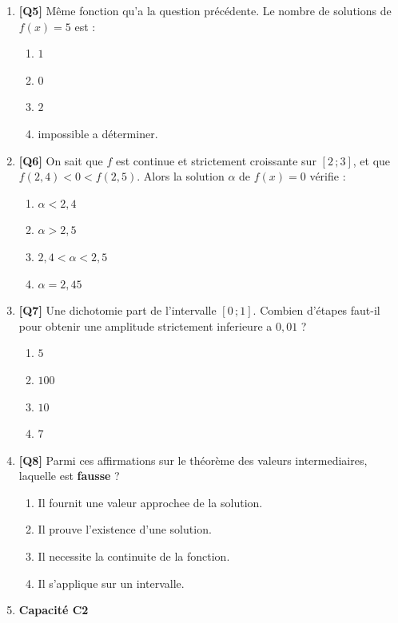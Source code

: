 \begin{enumerate}
\item \textbf{[Q5]} Même fonction qu'a la question précédente. Le nombre de solutions de $f(x) = 5$ est :
  \begin{enumerate}[label=\Alph*.]
    \item $1$
    \item $0$
    \item $2$
    \item impossible a déterminer.
  \end{enumerate}

\item \textbf{[Q6]} On sait que $f$ est continue et strictement croissante sur $[2\,;3]$, et que $f(2{,}4) < 0 < f(2{,}5)$. Alors la solution $\alpha$ de $f(x) = 0$ vérifie :
  \begin{enumerate}[label=\Alph*.]
    \item $\alpha < 2{,}4$
    \item $\alpha > 2{,}5$
    \item $2{,}4 < \alpha < 2{,}5$
    \item $\alpha = 2{,}45$
  \end{enumerate}

\item \textbf{[Q7]} Une dichotomie part de l'intervalle $[0\,;1]$. Combien d'étapes faut-il pour obtenir une amplitude strictement inferieure a $0{,}01$ ?
  \begin{enumerate}[label=\Alph*.]
    \item $5$
    \item $100$
    \item $10$
    \item $7$
  \end{enumerate}

\item \textbf{[Q8]} Parmi ces affirmations sur le théorème des valeurs intermediaires, laquelle est \textbf{fausse} ?
  \begin{enumerate}[label=\Alph*.]
    \item Il fournit une valeur approchee de la solution.
    \item Il prouve l'existence d'une solution.
    \item Il necessite la continuite de la fonction.
    \item Il s'applique sur un intervalle.
  \end{enumerate}

\item[] \textbf{Capacité C2}


\end{enumerate}
